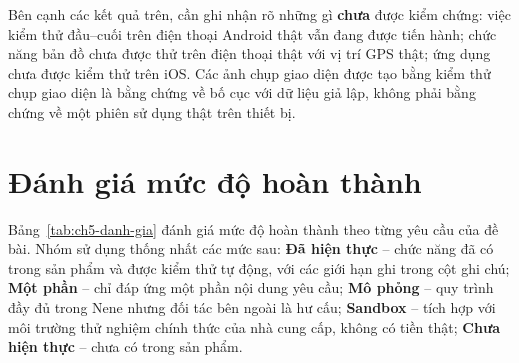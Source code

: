 Bên cạnh các kết quả trên, cần ghi nhận rõ những gì \textbf{chưa} được kiểm chứng: việc kiểm thử đầu--cuối trên điện thoại Android thật vẫn đang được tiến hành; chức năng bản đồ chưa được thử trên điện thoại thật với vị trí GPS thật; ứng dụng chưa được kiểm thử trên iOS. Các ảnh chụp giao diện được tạo bằng kiểm thử chụp giao diện là bằng chứng về bố cục với dữ liệu giả lập, không phải bằng chứng về một phiên sử dụng thật trên thiết bị.

\section{Đánh giá mức độ hoàn thành}
\label{sec:ch5-danh-gia}

Bảng~\ref{tab:ch5-danh-gia} đánh giá mức độ hoàn thành theo từng yêu cầu của đề bài. Nhóm sử dụng thống nhất các mức sau: \textbf{Đã hiện thực} -- chức năng đã có trong sản phẩm và được kiểm thử tự động, với các giới hạn ghi trong cột ghi chú; \textbf{Một phần} -- chỉ đáp ứng một phần nội dung yêu cầu; \textbf{Mô phỏng} -- quy trình đầy đủ trong Nene nhưng đối tác bên ngoài là hư cấu; \textbf{Sandbox} -- tích hợp với môi trường thử nghiệm chính thức của nhà cung cấp, không có tiền thật; \textbf{Chưa hiện thực} -- chưa có trong sản phẩm.

